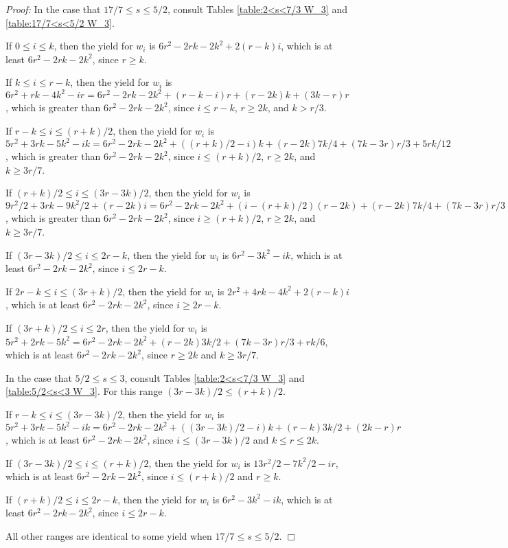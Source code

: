 \documentclass[11pt]{article}
\newcommand\QED{\ifhmode\allowbreak\else\nobreak\fi
\quad\nobreak$\Box$\medbreak}
\newcommand{\proofstart}{\par\noindent \emph{Proof:} }
\newcommand{\proofend}{\QED\par}
\newenvironment{proof}{\proofstart}{\proofend}
\begin{document}
\begin{proof}
In the case that $17/7 \leq s \leq 5/2$, consult Tables \ref{table:2<s<7/3 W_3} and \ref{table:17/7<s<5/2 W_3}.

If $0 \leq i \leq k$, then the yield for $w_i$ is $6r^2 - 2rk - 2k^2 + 2(r - k)i$, which is at least $6r^2 - 2rk - 2k^2$, since $r \geq k$.

If $k \leq i \leq r - k$, then the yield for $w_i$ is $6r^2 + rk - 4k^2 - ir = 6r^2 -2rk -2k^2 +(r-k-i)r +(r-2k)k +(3k-r)r$, which is greater than $6r^2 - 2rk - 2k^2$, since $i \leq r - k$, $r \geq 2k$, and $k > r/3$.

If $r - k \leq i \leq (r + k)/2$, then the yield for $w_i$ is $5r^2 + 3rk - 5k^2 - ik = 6r^2 -2rk -2k^2 +((r+k)/2 -i)k +(r-2k)7k/4 +(7k-3r)r/3 +5rk/12$, which is greater than $6r^2 - 2rk - 2k^2$, since $i \leq (r + k)/2$, $r \geq 2k$, and $k \geq 3r/7$.

If $(r + k)/2 \leq i \leq (3r - 3k)/2$, then the yield for $w_i$ is $9r^2/2 + 3rk - 9k^2/2 + (r - 2k)i = 6r^2 -2rk -2k^2 +(i-(r+k)/2)(r-2k) +(r-2k)7k/4 +(7k-3r)r/3 +5rk/12$, which is greater than $6r^2 - 2rk - 2k^2$, since $i \geq (r + k)/2$, $r \geq 2k$, and $k\geq 3r/7$.

If $(3r - 3k)/2 \leq i \leq 2r - k$, then the yield for $w_i$ is $6r^2 - 3k^2 - ik$, which is at least $6r^2 - 2rk - 2k^2$, since  $i \leq 2r - k$.

If $2r - k \leq i \leq (3r + k)/2$, then the yield for $w_i$ is $2r^2 + 4rk - 4k^2 + 2(r - k)i$, which is at least $6r^2 - 2rk - 2k^2$, since $i \geq 2r - k$.

If $(3r + k)/2 \leq i \leq 2r$, then the yield for $w_i$ is $5r^2 + 2rk - 5k^2 = 6r^2 -2rk -2k^2 +(r-2k)3k/2 +(7k-3r)r/3 + rk/6$, which is at least $6r^2 - 2rk - 2k^2$, since $r \geq 2k$ and $k \geq 3r/7$.

In the case that $5/2 \leq s \leq 3$, consult Tables \ref{table:2<s<7/3 W_3} and \ref{table:5/2<s<3 W_3}.  For this range $(3r - 3k)/2 \leq (r + k)/2$.

If $r - k \leq i \leq (3r - 3k)/2$, then the yield for $w_i$ is $5r^2 + 3rk - 5k^2 - ik = 6r^2 -2rk -2k^2 +((3r-3k)/2 -i)k +(r-k)3k/2 +(2k-r)r$, which is at least $6r^2 - 2rk - 2k^2$, since $i \leq (3r - 3k)/2$ and $k \leq r \leq 2k$.

If $(3r - 3k)/2 \leq i \leq (r + k)/2$, then the yield for $w_i$ is $13r^2/2 - 7k^2/2 - ir$, which is at least $6r^2 - 2rk - 2k^2$, since $i \leq (r + k)/2$ and $r \geq k$.

If $(r + k)/2 \leq i \leq 2r - k$, then the yield for $w_i$ is $6r^2 - 3k^2 - ik$, which is at least $6r^2 - 2rk - 2k^2$, since $i \leq 2r - k$.

All other ranges are identical to some yield when $17/7 \leq s \leq 5/2$.
\end{proof}
\end{document}

